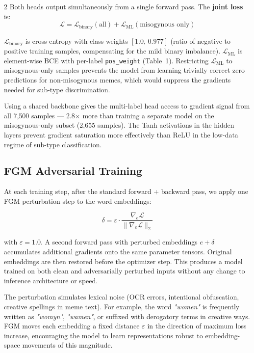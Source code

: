 \documentclass[11pt]{article}
\begin{document}
\begin{multicols}{2}
Both heads output simultaneously from a single forward pass. The \textbf{joint loss} is:
\[
\mathcal{L} = \mathcal{L}_{\text{binary}}(\text{all}) + \mathcal{L}_{\text{ML}}(\text{misogynous only})
\]

$\mathcal{L}_{\text{binary}}$ is cross-entropy with class weights $[1.0,\, 0.977]$ (ratio of negative to positive training samples, compensating for the mild binary imbalance). $\mathcal{L}_{\text{ML}}$ is element-wise BCE with per-label \texttt{pos\_weight} (Table~1). Restricting $\mathcal{L}_{\text{ML}}$ to misogynous-only samples prevents the model from learning trivially correct zero predictions for non-misogynous memes, which would suppress the gradients needed for sub-type discrimination.

Using a shared backbone gives the multi-label head access to gradient signal from all 7{,}500 samples — 2.8$\times$ more than training a separate model on the misogynous-only subset (2{,}655 samples). The Tanh activations in the hidden layers prevent gradient saturation more effectively than ReLU in the low-data regime of sub-type classification.

\subsection{FGM Adversarial Training}

At each training step, after the standard forward + backward pass, we apply one FGM perturbation step to the word embeddings:

\[
\delta = \varepsilon \cdot \frac{\nabla_e \mathcal{L}}{\|\nabla_e \mathcal{L}\|_2}
\]

with $\varepsilon=1.0$. A second forward pass with perturbed embeddings $e + \delta$ accumulates additional gradients onto the same parameter tensors. Original embeddings are then restored before the optimizer step. This produces a model trained on both clean and adversarially perturbed inputs without any change to inference architecture or speed.

The perturbation simulates lexical noise (OCR errors, intentional obfuscation, creative spellings in meme text). For example, the word \textit{"women"} is frequently written as \textit{"womyn"}, \textit{"wamen"}, or suffixed with derogatory terms in creative ways. FGM moves each embedding a fixed distance $\varepsilon$ in the direction of maximum loss increase, encouraging the model to learn representations robust to embedding-space movements of this magnitude.


\end{multicols}
\end{document}
